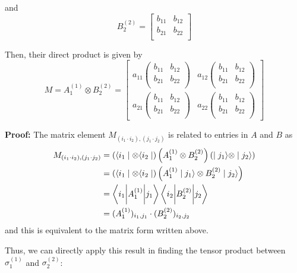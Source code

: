 \documentclass[twoside]{article}
\begin{document}
\begin{enumerate}
   and 
   \[ B_2^{(2)} = \begin{bmatrix}
      b_{11} & b_{12} \\
      b_{21} & b_{22} \\
   \end{bmatrix} \]

   Then, their direct product is given by 
   \[ M = A_1^{(1)} \otimes B_2^{(2)} = \begin{bmatrix}
      a_{11} \begin{pmatrix}
         b_{11} & b_{12} \\
      b_{21} & b_{22} \\
      \end{pmatrix} &       a_{12} \begin{pmatrix}
         b_{11} & b_{12} \\
      b_{21} & b_{22} \\
      \end{pmatrix} \\
      a_{21} \begin{pmatrix}
         b_{11} & b_{12} \\
      b_{21} & b_{22} \\
      \end{pmatrix} &       a_{22} \begin{pmatrix}
         b_{11} & b_{12} \\
      b_{21} & b_{22} \\
      \end{pmatrix}
   \end{bmatrix} \]

   \textbf{Proof:}
   The matrix element $M_{(i_1 \cdot i_2), (j_1 \cdot j_2)}$ is related to entries in $A$ and $B$ as 
   \begin{align*}
      M_{(i_1 \cdot i_2), (j_1 \cdot j_2)} &= \left( \langle i_1\mid \otimes \langle i_2\mid \right) \left( A_1^{(1)} \otimes B_2^{(2)} \right) \left( \mid j_1\rangle \otimes \mid j_2\rangle \right) \\
      &= \left( \langle i_1\mid \otimes \langle i_2\mid \right) \left( A_1^{(1)} \mid j_1\rangle \otimes B_2^{(2)} \mid j_2\rangle \right) \\
      &= \left\langle i_1 \bigg\rvert  A_1^{(1)} \biggr\rvert j_1 \right\rangle\left\langle i_2 \bigg\rvert  B_2^{(2)} \biggr\rvert j_2 \right\rangle \\
      &= (A_1^{(1)})_{i_1, j_1} \cdot (B_2^{(2)})_{i_2, j_2}
   \end{align*}
   and this is equivalent to the matrix form written above.

   Thus, we can directly apply this result in finding the tensor product between $\sigma_1^{(1)}$ and $\sigma_2^{(2)}$:
   

\end{enumerate}
\end{document}
